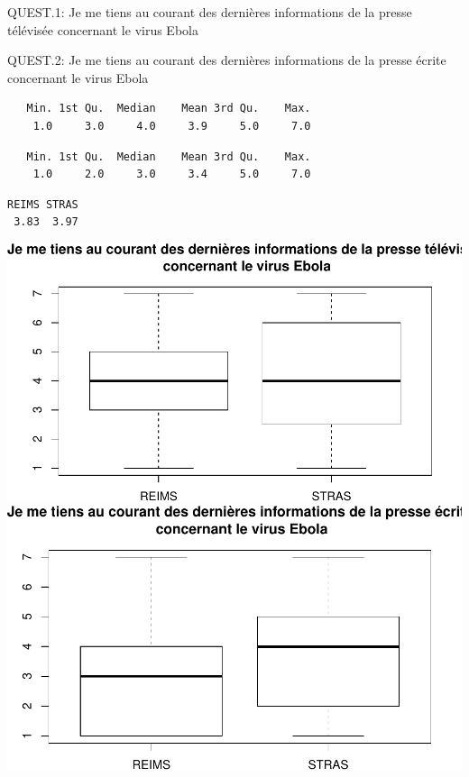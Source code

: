 \documentclass[]{article}
\begin{document}
QUEST.1: Je me tiens au courant des dernières informations de la presse
télévisée concernant le virus Ebola

QUEST.2: Je me tiens au courant des dernières informations de la presse
écrite concernant le virus Ebola

\begin{verbatim}
   Min. 1st Qu.  Median    Mean 3rd Qu.    Max. 
    1.0     3.0     4.0     3.9     5.0     7.0 
\end{verbatim}

\begin{verbatim}
   Min. 1st Qu.  Median    Mean 3rd Qu.    Max. 
    1.0     2.0     3.0     3.4     5.0     7.0 
\end{verbatim}

\begin{verbatim}
REIMS STRAS 
 3.83  3.97 
\end{verbatim}

\includegraphics{analyse_files/figure-latex/unnamed-chunk-14-1.pdf}
\includegraphics{analyse_files/figure-latex/unnamed-chunk-14-2.pdf}
\end{document}
